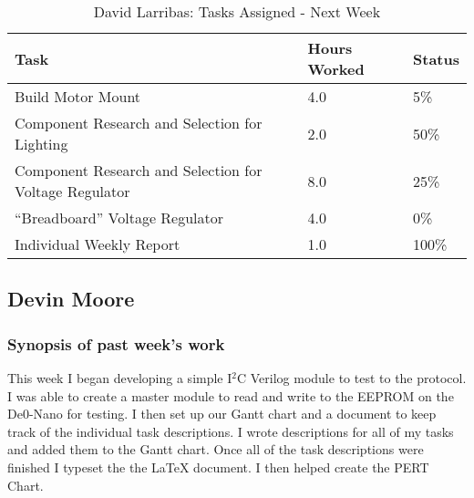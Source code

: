 \documentclass[12pt,compsoc]{IEEEtran}
\begin{document}
	\begin{table}[ht]
	\renewcommand{\arraystretch}{1.3}
		\caption{David Larribas: Tasks Assigned - Next Week}
		
		\label{Summary of David Larribas' activites: this week}
		
		\centering
		\begin{tabular}{p{5.5cm}|p{1cm}|p{1cm}}
		\hline

		\bfseries 	Task		 	                         			    & \bfseries Hours Worked	& \bfseries Status	\\
		\hline\hline
					Build Motor Mount										& 4.0 						& 5\%				\\
					Component Research and Selection for Lighting			& 2.0 						& 50\%				\\
					Component Research and Selection for Voltage Regulator	& 8.0 						& 25\%				\\
					“Breadboard” Voltage Regulator							& 4.0 						& 0\%				\\
					Individual Weekly Report								& 1.0 						& 100\% 			\\
                    \hline
		\end{tabular}
	\end{table}   

\subsection{Devin Moore}

	\subsubsection*{Synopsis of past week's work}

	This week I began developing a simple I$^2$C Verilog module to test to the protocol. I was able to 
	create a master module to read and write to the EEPROM on the De0-Nano for testing. I then set  
	up our Gantt chart and a document to keep track of the individual task descriptions. I wrote 
	descriptions for all of my tasks and added them to the Gantt chart. Once all of the task descriptions
	were finished I typeset the the LaTeX document. I then helped create the PERT Chart.
\end{document}
